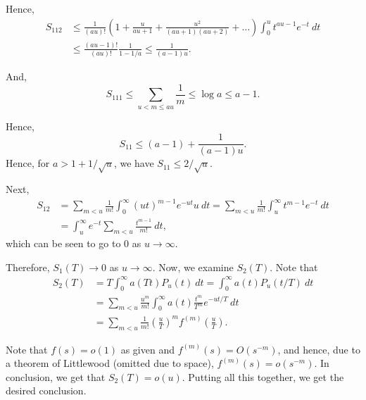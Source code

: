 Hence, 
\begin{align*}
	S_{112}&\le\frac{1}{(au)!}\left(1 + \frac{u}{au + 1} + \frac{u^2}{(au + 1)(au + 2)} + \dots\right)\int_0^u t^{au - 1}e^{-t}~dt\\
	&\le\frac{(au - 1)!}{(au)!}\frac{1}{1 - 1/a}\le\frac{1}{(a - 1)u}.
\end{align*}

And, 
\begin{equation*}
	S_{111}\le\sum_{u < m\le au}\frac{1}{m}\le\log a\le a - 1.
\end{equation*}

Hence, 
\begin{equation*}
	S_{11}\le (a - 1) + \frac{1}{(a - 1)u}.
\end{equation*}
Hence, for $a > 1 + 1/\sqrt u$, we have $S_{11}\le 2/\sqrt u$. 

Next, 
\begin{align*}
	S_{12} &=\sum_{m < u}\frac{1}{m!}\int_0^\infty(ut)^{m - 1}e^{-ut}u~dt = \sum_{m < u}\frac{1}{m!}\int_u^\infty t^{m - 1}e^{-t}~dt\\
	&= \int_u^\infty e^{-t}\sum_{m < u}\frac{t^{m - 1}}{m!}~dt,
\end{align*}
which can be seen to go to $0$ as $u\to\infty$.

Therefore, $S_1(T)\to 0$ as $u\to\infty$. Now, we examine $S_2(T)$. Note that 
\begin{align*}
	S_2(T) &= T\int_0^\infty a(Tt)P_u(t)~dt = \int_0^\infty a(t)P_u(t/T)~dt\\
	&= \sum_{m < u}\frac{u^m}{m!}\int_0^\infty a(t)\frac{t^m}{T^m}e^{-ut/T}~dt\\
	&= \sum_{m < u}\frac{1}{m!}\left(\frac{u}{T}\right)^m f^{(m)}\left(\frac{u}{T}\right).
\end{align*}

Note that $f(s) = o(1)$ as given and $f^{(m)}(s) = O(s^{-m})$, and hence, due to a theorem of Littlewood (omitted due to space), $f^{(m)}(s) = o(s^{-m})$. In conclusion, we get that $S_2(T) = o(u)$. Putting all this together, we get the desired conclusion.